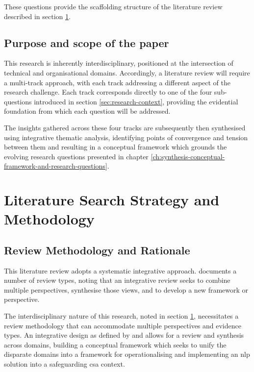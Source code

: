 \documentclass[12pt,a4paper,oneside]{report}
\begin{document}
These questions provide the scaffolding structure of the literature review described in section \ref{sec:purpose-and-scope-of-the-paper}.

\section{Purpose and scope of the paper}  
\label{sec:purpose-and-scope-of-the-paper}
This research is inherently interdisciplinary, positioned at the intersection of technical and organisational domains. Accordingly, a literature review will require a multi-track approach, with each track addressing a different aspect of the research challenge. Each track corresponds directly to one of the four sub-questions introduced in section \ref{sec:research-context}, providing the evidential foundation from which each question will be addressed.

The insights gathered across these four tracks are subsequently then synthesised using integrative thematic analysis, identifying points of convergence and tension between them and resulting in a conceptual framework which grounds the evolving research questions presented in chapter \ref{ch:synthesis-conceptual-framework-and-research-questions}.

\chapter{Literature Search Strategy and Methodology}  
\label{ch:literature-search-strategy-and-methodology}

\section{Review Methodology and Rationale}
\label{sec:review-methodology-and-rationale}
This literature review adopts a systematic integrative approach.  \citet{snyder2019literature} documents a number of review types, noting that an integrative review seeks to combine multiple perspectives, synthesise those views, and to develop a new framework or perspective.

The interdisciplinary nature of this research, noted in section \ref{sec:purpose-and-scope-of-the-paper}, necessitates a review methodology that can accommodate multiple perspectives and evidence types.  An integrative design as defined by \citet{torraco2016writing} and \citet{torraco2005writing} allows for a review and synthesis across domains, building a conceptual framework which seeks to unify the disparate domains into a framework for operationalising and implementing an \gls{nlp} solution into a safeguarding \gls{csa} context.
\end{document}
